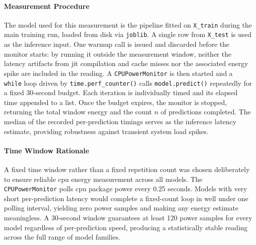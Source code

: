 \paragraph{Measurement Procedure}
The model used for this measurement is the pipeline fitted on \texttt{X\_train} during the main training run, loaded from disk via \texttt{joblib}. A single row from \texttt{X\_test} is used as the inference input. One warmup call is issued and discarded before the monitor starts: by running it outside the measurement window, neither the latency artifacts from \gls{jit} compilation and cache misses nor the associated energy spike are included in the reading. A \texttt{CPUPowerMonitor} is then started and a \texttt{while} loop driven by \texttt{time.perf\_counter()} calls \texttt{model.predict()} repeatedly for a fixed 30-second budget. Each iteration is individually timed and its elapsed time appended to a list. Once the budget expires, the monitor is stopped, returning the total window energy and the count $n$ of predictions completed. The median of the recorded per-prediction timings serves as the inference latency estimate, providing robustness against transient system load spikes.

\paragraph{Time Window Rationale}
A fixed time window rather than a fixed repetition count was chosen deliberately to ensure reliable \gls{cpu} energy measurement across all models. The \texttt{CPUPowerMonitor} polls \gls{cpu} package power every 0.25 seconds. Models with very short per-prediction latency would complete a fixed-count loop in well under one polling interval, yielding zero power samples and making any energy estimate meaningless. A 30-second window guarantees at least 120 power samples for every model regardless of per-prediction speed, producing a statistically stable reading across the full range of model families.

